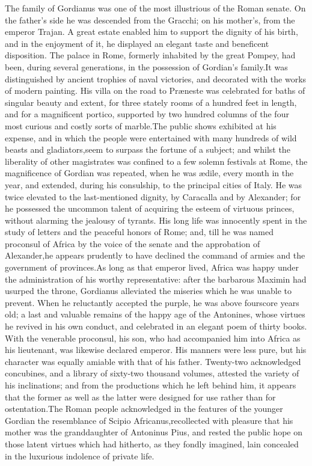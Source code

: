 The family of Gordianus was one of the most illustrious of the
Roman senate. On the father’s side he was descended from the
Gracchi; on his mother’s, from the emperor Trajan. A great estate
enabled him to support the dignity of his birth, and in the
enjoyment of it, he displayed an elegant taste and beneficent
disposition. The palace in Rome, formerly inhabited by the great
Pompey, had been, during several generations, in the possession
of Gordian’s family.\footnotemark[15] It was distinguished by ancient trophies
of naval victories, and decorated with the works of modern
painting. His villa on the road to Præneste was celebrated for
baths of singular beauty and extent, for three stately rooms of a
hundred feet in length, and for a magnificent portico, supported
by two hundred columns of the four most curious and costly sorts
of marble.\footnotemark[16] The public shows exhibited at his expense, and in
which the people were entertained with many hundreds of wild
beasts and gladiators,\footnotemark[17] seem to surpass the fortune of a
subject; and whilst the liberality of other magistrates was
confined to a few solemn festivals at Rome, the magnificence of
Gordian was repeated, when he was ædile, every month in the year,
and extended, during his consulship, to the principal cities of
Italy. He was twice elevated to the last-mentioned dignity, by
Caracalla and by Alexander; for he possessed the uncommon talent
of acquiring the esteem of virtuous princes, without alarming the
jealousy of tyrants. His long life was innocently spent in the
study of letters and the peaceful honors of Rome; and, till he
was named proconsul of Africa by the voice of the senate and the
approbation of Alexander,\footnotemark[18] he appears prudently to have
declined the command of armies and the government of provinces.\footnotemark[181]
As long as that emperor lived, Africa was happy under the
administration of his worthy representative: after the barbarous
Maximin had usurped the throne, Gordianus alleviated the miseries
which he was unable to prevent. When he reluctantly accepted the
purple, he was above fourscore years old; a last and valuable
remains of the happy age of the Antonines, whose virtues he
revived in his own conduct, and celebrated in an elegant poem of
thirty books. With the venerable proconsul, his son, who had
accompanied him into Africa as his lieutenant, was likewise
declared emperor. His manners were less pure, but his character
was equally amiable with that of his father. Twenty-two
acknowledged concubines, and a library of sixty-two thousand
volumes, attested the variety of his inclinations; and from the
productions which he left behind him, it appears that the former
as well as the latter were designed for use rather than for
ostentation.\footnotemark[19] The Roman people acknowledged in the features of
the younger Gordian the resemblance of Scipio Africanus,\footnotemark[191]
recollected with pleasure that his mother was the granddaughter
of Antoninus Pius, and rested the public hope on those latent
virtues which had hitherto, as they fondly imagined, lain
concealed in the luxurious indolence of private life.

